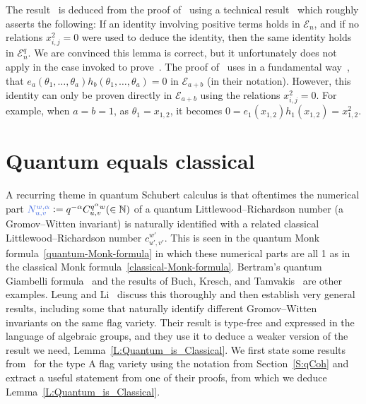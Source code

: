 \documentclass[12pt,oneside,reqno]{amsart}
\theoremstyle{definition}
\numberwithin{equation}{section}
\newcommand{\NN}{{\mathbb N}}
\newcommand{\defcolor}[1]{{\color{RoyalBlue}#1}}
\begin{document}
The result~\cite[Thm.~15]{MPP} is deduced from the proof of~\cite[Thm.~8]{MPP} using a technical
result~\cite[Lem.~13]{MPP} which roughly asserts the following:
If an identity involving positive terms holds in ${\mathcal E}_n$, and if no relations  $x_{i,j}^2=0$ were used to deduce
the identity, then the same identity holds in ${\mathcal E}^q_n$.
We are convinced this lemma is correct, but it unfortunately does not apply in the case
invoked to prove~\cite[Thm.~15]{MPP}.
The proof of~\cite[Thm.~8]{MPP} uses in a fundamental way~\cite[Cor.~10]{MPP}, that
$e_a(\theta_1,\dotsc,\theta_a)h_b(\theta_1,\dotsc,\theta_a)=0$ in $\mathcal{E}_{a+b}$ (in their notation).
However, this identity can only be proven directly in  $\mathcal{E}_{a+b}$ using the relations $x_{i,j}^2=0$.
For example, when $a=b=1$, as $\theta_1=x_{1,2}$, it becomes $0=e_1(x_{1,2})h_1(x_{1,2})=x_{1,2}^2$.

%
%
%
\section{Quantum equals classical}
\label{quantum-equals-classical}

A recurring theme in quantum Schubert calculus is that oftentimes the numerical part
$\defcolor{N^{w,\alpha}_{u,v}}\vcentcolon=q^{-\alpha}C^{q^\alpha w}_{u,v}(\in\NN)$ of a quantum
Littlewood--Richardson number (a Gromov--Witten invariant)
is naturally identified with a related classical Littlewood--Richardson number $c^{w'}_{u',v'}$.
This is seen in the quantum Monk formula~\eqref{quantum-Monk-formula} in which these numerical parts are all 1 as in the
classical Monk formula~\eqref{classical-Monk-formula}.
Bertram's quantum Giambelli formula~\cite{Bertram} and the results of Buch, Kresch, and Tamvakis~\cite{BKT} are other
examples. 
Leung and Li~\cite{LeungLi2012} discuss this thoroughly and then establish very general results, including some that
naturally identify different Gromov--Witten invariants on the same flag variety. 
Their result is type-free and expressed in the language of algebraic groups, and they use it to deduce a 
weaker version of the result we need, Lemma~\ref{L:Quantum_is_Classical}.
We first state some results from~\cite{LeungLi2012} for the type A flag variety using the notation from Section~\ref{S:qCoh} and extract
a useful statement from one of their proofs, from which we deduce  Lemma~\ref{L:Quantum_is_Classical}.
\end{document}
